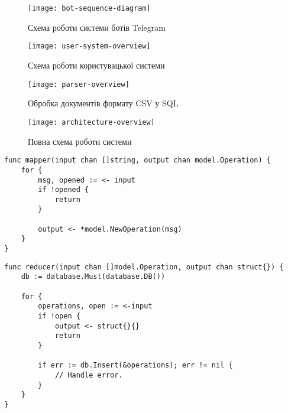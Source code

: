 \chapter{}

\begin{figure}[h]
\centering
\texttt{[image: bot-sequence-diagram]}
\caption{Схема роботи системи ботів Telegram}
\label{fig:bot-sequence-diagram}
\end{figure}

\begin{figure}[h]
\centering
\texttt{[image: user-system-overview]}
\caption{Схема роботи користувацької системи}
\label{fig:user-system-overview}
\end{figure}

\begin{figure}[h]
\centering
\texttt{[image: parser-overview]}
\caption{Обробка документів формату CSV у SQL}
\label{fig:parser-overview}
\end{figure}

\begin{figure}[h]
\centering
\texttt{[image: architecture-overview]}
\caption{Повна схема роботи системи}
\label{fig:architecture-overview}
\end{figure}

\pagebreak

\begin{lstlisting}[caption={Реалізація функції Map},captionpos=b]
func mapper(input chan []string, output chan model.Operation) {
	for {
		msg, opened := <- input
		if !opened {
			return
		}

		output <- *model.NewOperation(msg)
	}
}
\end{lstlisting}

\begin{lstlisting}[caption={Реалізація функції Reduce},captionpos=b]
func reducer(input chan []model.Operation, output chan struct{}) {
	db := database.Must(database.DB())

	for {
		operations, open := <-input
		if !open {
			output <- struct{}{}
			return
		}

		if err := db.Insert(&operations); err != nil {
			// Handle error.
		}
	}
}
\end{lstlisting}
